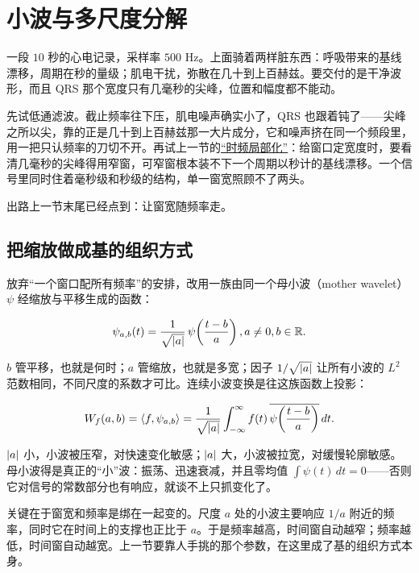 \section{小波与多尺度分解}
\label{sec:08-Numerical-Analysis/08-Fourier-and-Spectral-Methods/06}

一段 \(10\) 秒的心电记录，采样率 \(500\) Hz。上面骑着两样脏东西：呼吸带来的基线漂移，周期在秒的量级；肌电干扰，弥散在几十到上百赫兹。要交付的是干净波形，而且 QRS 那个宽度只有几毫秒的尖峰，位置和幅度都不能动。

先试低通滤波。截止频率往下压，肌电噪声确实小了，QRS 也跟着钝了——尖峰之所以尖，靠的正是几十到上百赫兹那一大片成分，它和噪声挤在同一个频段里，用一把只认频率的刀切不开。再试上一节的\hyperref[sec:08-Numerical-Analysis/08-Fourier-and-Spectral-Methods/05]{``时频局部化''}：给窗口定宽度时，要看清几毫秒的尖峰得用窄窗，可窄窗根本装不下一个周期以秒计的基线漂移。一个信号里同时住着毫秒级和秒级的结构，单一窗宽照顾不了两头。

出路上一节末尾已经点到：让窗宽随频率走。

\subsection{把缩放做成基的组织方式}

放弃``一个窗口配所有频率''的安排，改用一族由同一个母小波（mother wavelet）\(\psi\) 经缩放与平移生成的函数：

\[
\psi_{a,b}(t)=\frac1{\sqrt{\left|a\right|}}\,\psi\!\left(\frac{t-b}{a}\right),\space a\neq0,\space b\in\mathbb{R} .
\]

\(b\) 管平移，也就是何时；\(a\) 管缩放，也就是多宽；因子 \(1/\sqrt{\left|a\right|}\) 让所有小波的 \(L^2\) 范数相同，不同尺度的系数才可比。连续小波变换是往这族函数上投影：

\[
W_f(a,b)=\left\langle f,\psi_{a,b}\right\rangle=\frac1{\sqrt{\left|a\right|}}\int_{-\infty}^{\infty}f(t)\,\overline{\psi\!\left(\frac{t-b}{a}\right)}\,dt .
\]

\(\left|a\right|\) 小，小波被压窄，对快速变化敏感；\(\left|a\right|\) 大，小波被拉宽，对缓慢轮廓敏感。母小波得是真正的``小''波：振荡、迅速衰减，并且零均值 \(\int\psi(t)\,dt=0\)——否则它对信号的常数部分也有响应，就谈不上只抓变化了。

关键在于窗宽和频率是绑在一起变的。尺度 \(a\) 处的小波主要响应 \(1/a\) 附近的频率，同时它在时间上的支撑也正比于 \(a\)。于是频率越高，时间窗自动越窄；频率越低，时间窗自动越宽。上一节要靠人手挑的那个参数，在这里成了基的组织方式本身。


